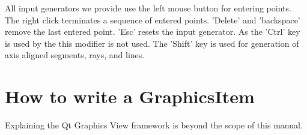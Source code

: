 All input generators we provide use the left mouse button for entering points.
The right click terminates a sequence of entered points. 'Delete' and 'backspace'
remove the last entered point. 'Esc' resets the input generator.  As the 'Ctrl' key
is used by the  this modifier is not used.  The 'Shift'
key is used for generation of axis aligned segments, rays, and lines. 

\section{How to write a GraphicsItem} 

Explaining the Qt Graphics View framework is beyond the scope of this manual.

